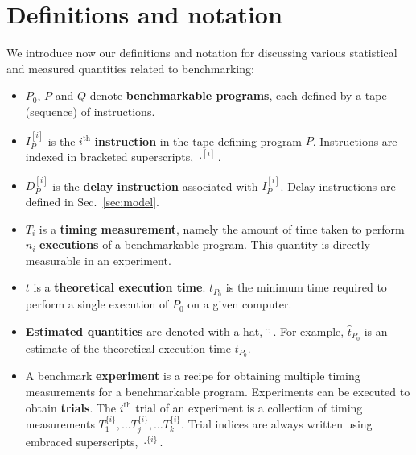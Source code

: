 \documentclass[conference]{IEEEtran}
\begin{document}
\section{Definitions and notation}
\label{sec:notation}

We introduce now our definitions and notation for discussing various
statistical and measured quantities related to benchmarking:

\begin{itemize}
    \item
    $P_0$, $P$ and $Q$ denote \textbf{benchmarkable programs}, each defined by
    a tape (sequence) of instructions.

    \item
    $I^{[i]}_{P}$ is the $i^{\textrm{th}}$ \textbf{instruction} in the tape
    defining program $P$.
    Instructions are indexed in bracketed superscripts, $\cdot^{[i]}$.

    \item
    $D^{[i]}_{P}$ is the \textbf{delay instruction} associated with $I^{[i]}_{P}$.
    Delay instructions are defined in Sec.~\ref{sec:model}.

    \item
    $T_i$ is a \textbf{timing measurement}, namely the amount of time taken to
    perform $n_i$ \textbf{executions} of a benchmarkable program. This quantity
    is directly measurable in an experiment.

    \item
    $t$ is a \textbf{theoretical execution time}.
    $t_{P_0}$ is the minimum time required to perform a single execution of
    $P_0$ on a given computer.

    \item
    \textbf{Estimated quantities} are denoted with a hat, $\hat\cdot$.
    For example, $\hat{t}_{P_0}$ is an estimate of the theoretical execution
    time $t_{P_0}$.

    \item
    A benchmark \textbf{experiment} is a recipe for obtaining multiple timing
    measurements for a benchmarkable program. Experiments can be executed to
obtain \textbf{trials}. The
    $i^{\textrm{th}}$ trial of an experiment is a collection of timing measurements
    $T^{\{i\}}_1, \dots T^{\{i\}}_j, \dots T^{\{i\}}_k$. Trial indices are always
    written using embraced superscripts, $\cdot^{\{i\}}$.


\end{itemize}
\end{document}
